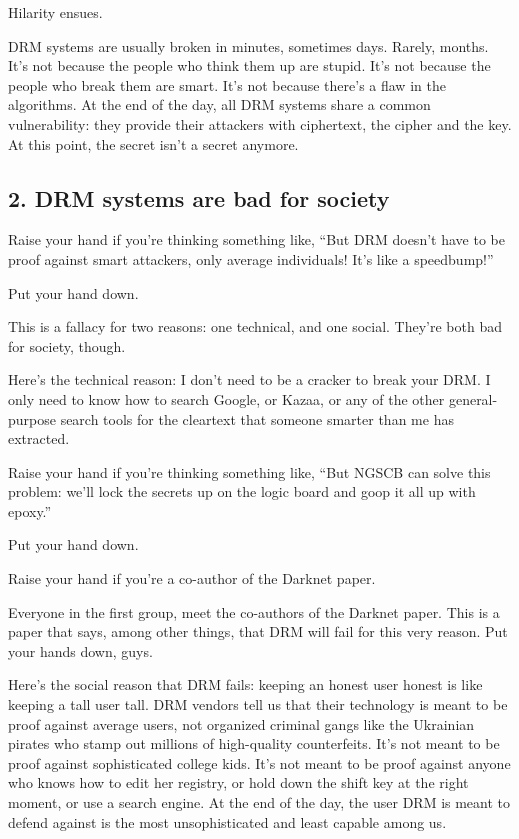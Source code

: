 Hilarity ensues.

DRM systems are usually broken in minutes, sometimes days. Rarely,
months. It's not because the people who think them up are stupid.
It's not because the people who break them are smart. It's not
because there's a flaw in the algorithms. At the end of the day,
all DRM systems share a common vulnerability: they provide their
attackers with ciphertext, the cipher and the key. At this point,
the secret isn't a secret anymore.

\subsection{2. DRM systems are bad for society}

Raise your hand if you're thinking something like, ``But DRM doesn't
have to be proof against smart attackers, only average individuals!
It's like a speedbump!''

Put your hand down.

This is a fallacy for two reasons: one technical, and one social.
They're both bad for society, though.

Here's the technical reason: I don't need to be a cracker to break
your DRM. I only need to know how to search Google, or Kazaa, or
any of the other general-purpose search tools for the cleartext
that someone smarter than me has extracted.

Raise your hand if you're thinking something like, ``But NGSCB can
solve this problem: we'll lock the secrets up on the logic board
and goop it all up with epoxy.''

Put your hand down.

Raise your hand if you're a co-author of the Darknet paper.

Everyone in the first group, meet the co-authors of the Darknet
paper. This is a paper that says, among other things, that DRM will
fail for this very reason. Put your hands down, guys.

Here's the social reason that DRM fails: keeping an honest user
honest is like keeping a tall user tall. DRM vendors tell us that
their technology is meant to be proof against average users, not
organized criminal gangs like the Ukrainian pirates who stamp out
millions of high-quality counterfeits. It's not meant to be proof
against sophisticated college kids. It's not meant to be proof
against anyone who knows how to edit her registry, or hold down the
shift key at the right moment, or use a search engine. At the end
of the day, the user DRM is meant to defend against is the most
unsophisticated and least capable among us.

